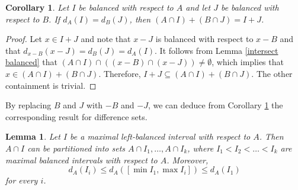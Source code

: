 \documentclass[11pt,reqno]{amsart}
\newtheorem{lemma}[theorem]{Lemma}
\newtheorem{corollary}[theorem]{Corollary}
\theoremstyle{definition}
\def\subset{\subseteq}
\begin{document}
\begin{corollary} \label{add balanced} Let $I$ be balanced with respect to $A$ and let $J$ be balanced with respect to $B$. If $d_A(I)=d_B(J)$, then $(A\cap I)+(B\cap J)=I+J$.
\end{corollary}

\begin{proof}
Let $x\in I+J$ and note that $x-J$ is balanced with respect to $x-B$ and that $d_{x-B}(x-J)=d_B(J)=d_A(I)$. It follows from Lemma \ref{intersect balanced} that $(A\cap I)\cap((x-B)\cap(x-J))\ne\emptyset$, which implies that $x\in(A\cap I)+(B\cap J)$. Therefore,   $I+J\subset(A\cap I)+(B\cap J)$. The other containment is trivial.
\end{proof}

By replacing $B$ and $J$ with $-B$ and $-J$, we can deduce from Corollary \ref{add balanced} the corresponding result for difference sets. 

\begin{lemma} \label{partition} Let $I$ be a maximal left-balanced interval with respect to $A$. Then $A\cap I$ can be partitioned into sets $A\cap I_1,\dots,A\cap I_k$, where $I_1<I_2<\dots<I_k$ are maximal balanced intervals with respect to $A$. Moreover,
\[d_A(I_i)\leq d_A([\min I_1,\max I_i])\leq d_A(I_1)\]
for every $i$.
\end{lemma}
\end{document}
